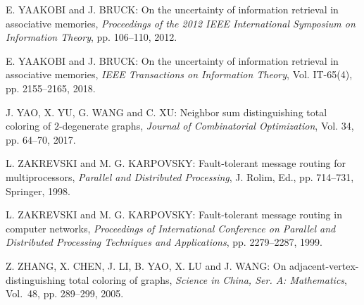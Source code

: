 \begin{thebibliography}{999}
E. YAAKOBI and J. BRUCK: On the uncertainty of information retrieval in associative memories, {\it Proceedings of the 2012 IEEE International Symposium on Information Theory}, pp. 106--110, 2012.

E. YAAKOBI and J. BRUCK: On the uncertainty of information retrieval in associative memories, {\it IEEE Transactions on Information Theory}, Vol. IT-65(4), pp. 2155--2165, 2018.

J. YAO, X. YU, G. WANG and C. XU: Neighbor sum distinguishing total coloring of $2$-degenerate graphs, {\it Journal of Combinatorial Optimization}, Vol. 34, pp. 64--70, 2017.

L. ZAKREVSKI and M. G. KARPOVSKY: Fault-tolerant message routing for multiprocessors, {\it Parallel and Distributed Processing}, J. Rolim, Ed., pp. 714--731, Springer, 1998.

L. ZAKREVSKI and M. G. KARPOVSKY: Fault-tolerant message routing in computer networks, {\it Proceedings of International Conference on Parallel and Distributed Processing Techniques and Applications}, pp. 2279--2287, 1999.

Z. ZHANG, X. CHEN, J. LI, B. YAO, X. LU and J. WANG: On adjacent-vertex-distinguishing total coloring of graphs, {\it Science in China, Ser. A: Mathematics}, Vol.~48, pp. 289--299, 2005.

\end{thebibliography}

